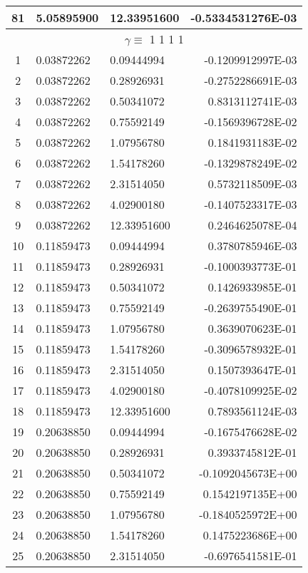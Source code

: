 \begin{longtable}{@{\extracolsep{\fill}}cllr@{}}
81  &  5.05895900  &  12.33951600  &  -0.5334531276E-03 \\
\midrule
\multicolumn{4}{c}{ $\gamma \equiv $  1 1 1 1} \\
\midrule
1  &  0.03872262  &  0.09444994  &  -0.1209912997E-03 \\
2  &  0.03872262  &  0.28926931  &  -0.2752286691E-03 \\
3  &  0.03872262  &  0.50341072  &   0.8313112741E-03 \\
4  &  0.03872262  &  0.75592149  &  -0.1569396728E-02 \\
5  &  0.03872262  &  1.07956780  &   0.1841931183E-02 \\
6  &  0.03872262  &  1.54178260  &  -0.1329878249E-02 \\
7  &  0.03872262  &  2.31514050  &   0.5732118509E-03 \\
8  &  0.03872262  &  4.02900180  &  -0.1407523317E-03 \\
9  &  0.03872262  &  12.33951600  &   0.2464625078E-04 \\
10  &  0.11859473  &  0.09444994  &   0.3780785946E-03 \\
11  &  0.11859473  &  0.28926931  &  -0.1000393773E-01 \\
12  &  0.11859473  &  0.50341072  &   0.1426933985E-01 \\
13  &  0.11859473  &  0.75592149  &  -0.2639755490E-01 \\
14  &  0.11859473  &  1.07956780  &   0.3639070623E-01 \\
15  &  0.11859473  &  1.54178260  &  -0.3096578932E-01 \\
16  &  0.11859473  &  2.31514050  &   0.1507393647E-01 \\
17  &  0.11859473  &  4.02900180  &  -0.4078109925E-02 \\
18  &  0.11859473  &  12.33951600  &   0.7893561124E-03 \\
19  &  0.20638850  &  0.09444994  &  -0.1675476628E-02 \\
20  &  0.20638850  &  0.28926931  &   0.3933745812E-01 \\
21  &  0.20638850  &  0.50341072  &  -0.1092045673E+00 \\
22  &  0.20638850  &  0.75592149  &   0.1542197135E+00 \\
23  &  0.20638850  &  1.07956780  &  -0.1840525972E+00 \\
24  &  0.20638850  &  1.54178260  &   0.1475223686E+00 \\
25  &  0.20638850  &  2.31514050  &  -0.6976541581E-01 \\

\end{longtable}
